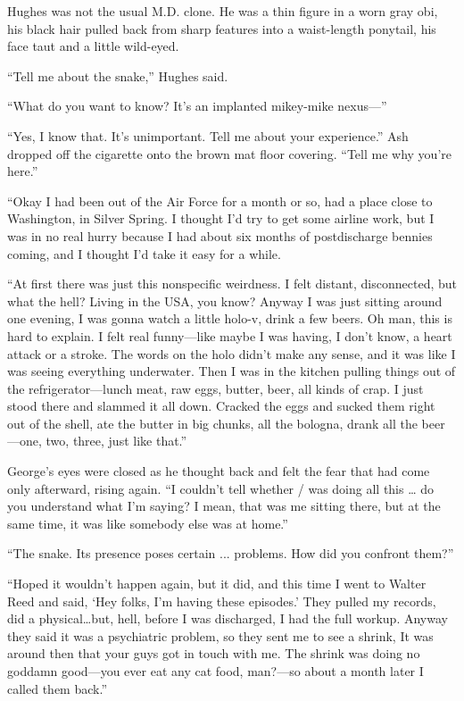 Hughes was not the usual M.D. clone. He was a thin figure in a worn gray obi, his black hair pulled back from sharp features into a waist-length ponytail, his face taut and a little wild-eyed.

``Tell me about the snake,'' Hughes said.

``What do you want to know? It’s an implanted mikey-mike nexus---''

``Yes, I know that. It’s unimportant. Tell me about your experience.'' Ash dropped off the cigarette onto the brown mat floor covering. ``Tell me why you’re here.''

``Okay I had been out of the Air Force for a month or so, had a place close to Washington, in Silver Spring. I thought I’d try to get some airline work, but I was in no real hurry because I had about six months of postdischarge bennies coming, and I thought I’d take it easy for a while.

``At first there was just this nonspecific weirdness. I felt distant, disconnected, but what the hell? Living in the USA, you know? Anyway I was just sitting around one evening, I was gonna watch a little holo-v, drink a few beers. Oh man, this is hard to explain. I felt real funny—like maybe I was having, I don’t know, a heart attack or a stroke. The words on the holo didn’t make any sense, and it was like I was seeing everything underwater. Then I was in the kitchen pulling things out of the refrigerator—lunch meat, raw eggs, butter, beer, all kinds of crap. I just stood there and slammed it all down. Cracked the eggs and sucked them right out of the shell, ate the butter in big chunks, all the bologna, drank all the beer—one, two, three, just like that.''

George's eyes were closed as he thought back and felt the fear that had come only afterward, rising again. ``I couldn't tell whether / was doing all this … do you understand what I’m saying? I mean, that was me sitting there, but at the same time, it was like somebody else was at home.''

``The snake. Its presence poses certain ... problems. How did you confront them?''

``Hoped it wouldn’t happen again, but it did, and this time I went to Walter Reed and said, ‘Hey folks, I’m having these episodes.’ They pulled my records, did a physical…but, hell, before I was discharged, I had the full workup. Anyway they said it was a psychiatric problem, so they sent me to see a shrink, It was around then that your guys got in touch with me. The shrink was doing no goddamn good—you ever eat any cat food, man?—so about a month later I called them back.''

